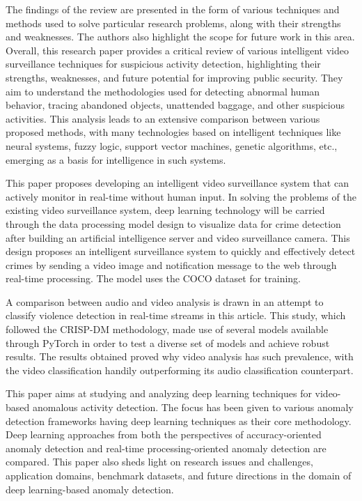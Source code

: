 \documentclass[conference]{IEEEtran}
\begin{document}
The findings of the review are presented in the form of various techniques and methods used to solve particular research problems, along with their strengths and weaknesses. The authors also highlight the scope for future work in this area. Overall, this research paper provides a critical review of various intelligent video surveillance techniques for suspicious activity detection, highlighting their strengths, weaknesses, and future potential for improving public security. They aim to understand the methodologies used for detecting abnormal human behavior, tracing abandoned objects, unattended baggage, and other suspicious activities. This analysis leads to an extensive comparison between various proposed methods, with many technologies based on intelligent techniques like neural systems, fuzzy logic, support vector machines, genetic algorithms, etc., emerging as a basis for intelligence in such systems. \cite{b6}

This paper proposes developing an intelligent video surveillance system that can actively monitor in real-time without human input. In solving the problems of the existing video surveillance system, deep learning technology will be carried through the data processing model design to visualize data for crime detection after building an artificial intelligence server and video surveillance camera. This design proposes an intelligent surveillance system to quickly and effectively detect crimes by sending a video image and notification message to the web through real-time processing. The model uses the COCO dataset for training. \cite{b7}

A comparison between audio and video analysis is drawn in an attempt to classify violence detection in real-time streams in this article. This study, which followed the CRISP-DM methodology, made use of several models available through PyTorch in order to test a diverse set of models and achieve robust results. The results obtained proved why video analysis has such prevalence, with the video classification handily outperforming its audio classification counterpart. \cite{b8}

This paper aims at studying and analyzing deep learning techniques for video-based anomalous activity detection. The focus has been given to various anomaly detection frameworks having deep learning techniques as their core methodology. Deep learning approaches from both the perspectives of accuracy-oriented anomaly detection and real-time processing-oriented anomaly detection are compared. \cite{b9} This paper also sheds light on research issues and challenges, application domains, benchmark datasets, and future directions in the domain of deep learning-based anomaly detection. 
\end{document}
